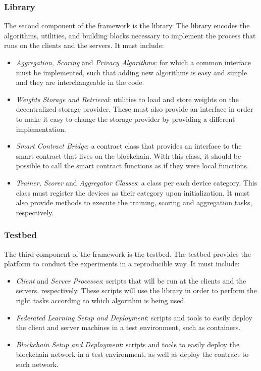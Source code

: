 \subsubsection{Library}\label{meth:library}

The second component of the framework is the library. The library encodes the algorithms, utilities, and building blocks necessary to implement the process that runs on the clients and the servers. It must include:

\begin{itemize}
    \item \textit{Aggregation, Scoring} and \textit{Privacy Algorithms}: for which a common interface must be implemented, such that adding new algorithms is easy and simple and they are interchangeable in the code.
    
    \item \textit{Weights Storage and Retrieval}: utilities to load and store weights on the decentralized storage provider. These must also provide an interface in order to make it easy to change the storage provider by providing a different implementation.
    
    \item \textit{Smart Contract Bridge}: a contract class that provides an interface to the smart contract that lives on the blockchain. With this class, it should be possible to call the smart contract functions as if they were local functions.
    
    \item \textit{Trainer, Scorer} and \textit{Aggregator Classes}: a class per each device category. This class must register the devices as their category upon initialization. It must also provide methods to execute the training, scoring and aggregation tasks, respectively.
\end{itemize}

\subsubsection{Testbed}\label{meth:testbed}

The third component of the framework is the testbed. The testbed provides the platform to conduct the experiments in a reproducible way. It must include:

\begin{itemize}
    \item \textit{Client} and \textit{Server Processes}: scripts that will be run at the clients and the servers, respectively. These scripts will use the library in order to perform the right tasks according to which algorithm is being used.
    
    \item \textit{Federated Learning Setup and Deployment}: scripts and tools to easily deploy the client and server machines in a test environment, such as containers.
    
    \item \textit{Blockchain Setup and Deployment}: scripts and tools to easily deploy the blockchain network in a test environment, as well as deploy the contract to such network.
\end{itemize}

